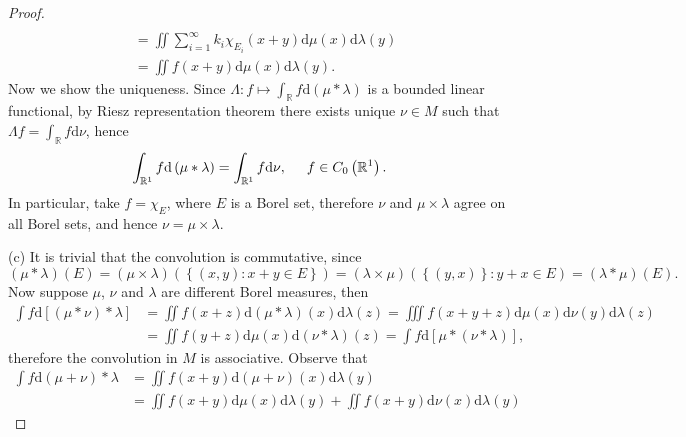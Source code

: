 \begin{proof}
$$\begin{aligned}
\\
&=\iint{\sum_{i=1}^{\infty}{k_i\chi _{E_i}\left( x+y \right) \mathrm{d}\mu \left( x \right) \mathrm{d}\lambda \left( y \right)}}
\\
&=\iint{f\left( x+y \right) \mathrm{d}\mu \left( x \right) \mathrm{d}\lambda \left( y \right)}.
\end{aligned}
$$
Now we show the uniqueness. Since $\Lambda:f\mapsto\int_{\mathbb{R}}f\mathrm{d}(\mu*\lambda)$ is a bounded linear functional, by Riesz representation theorem there exists unique $\nu\in M$ such that $\Lambda f=\int_{\mathbb{R}}f\mathrm{d}\nu$, hence 
$$
\int_{\mathbb{R} ^1}{f\mathrm{d}\left( \mu *\lambda \right)}=\int_{\mathbb{R} ^1}{f\mathrm{d}\nu},\hspace{0.5cm}f\in C_0\left( \mathbb{R} ^1 \right) .
$$
In particular, take $f=\chi_E$, where $E$ is a Borel set, therefore $\nu$ and $\mu\times\lambda$ agree on all Borel sets, and hence $\nu=\mu\times\lambda$.\par
(c) It is trivial that the convolution is commutative, since 
$$
\left( \mu *\lambda \right) \left( E \right) =\left( \mu \times \lambda \right) \left( \left\{ \left( x,y \right) :x+y\in E \right\} \right) =\left( \lambda \times \mu \right) \left( \left\{ \left( y,x \right) \right\} :y+x\in E \right) =\left( \lambda *\mu \right) \left( E \right) .
$$
Now suppose $\mu$, $\nu$ and $\lambda$ are different Borel measures, then 
$$
\begin{aligned}
\int{f\mathrm{d}\left[ \left( \mu *\nu \right) *\lambda \right]}&=\iint{f\left( x+z \right) \mathrm{d}\left( \mu *\lambda \right) \left( x \right) \mathrm{d}\lambda \left( z \right)}=\iiint{f\left( x+y+z \right) \mathrm{d}\mu \left( x \right) \mathrm{d}\nu \left( y \right) \mathrm{d}\lambda \left( z \right)}
\\
&=\iint{f\left( y+z \right) \mathrm{d}\mu \left( x \right) \mathrm{d}\left( \nu *\lambda \right) \left( z \right)}=\int{f\mathrm{d}\left[ \mu *\left( \nu *\lambda \right) \right]},
\end{aligned}
$$
therefore the convolution in $M$ is associative. Observe that 
$$
\begin{aligned}
\int{f\mathrm{d}\left( \mu +\nu \right) *\lambda}&=\iint{f\left( x+y \right) \mathrm{d}\left( \mu +\nu \right) \left( x \right) \mathrm{d}\lambda \left( y \right)}
\\
&=\iint{f\left( x+y \right) \mathrm{d}\mu \left( x \right) \mathrm{d}\lambda \left( y \right)}+\iint{f\left( x+y \right) \mathrm{d}\nu \left( x \right) \mathrm{d}\lambda \left( y \right)}

\end{aligned}$$
\end{proof}
